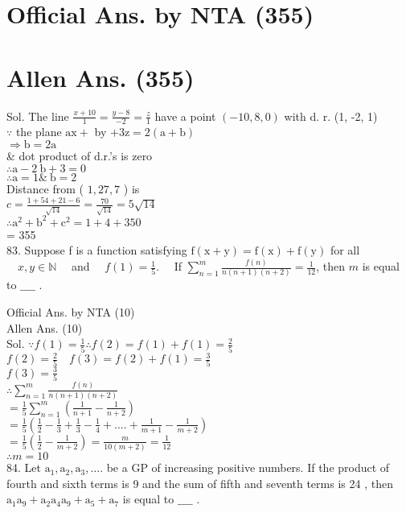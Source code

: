 \documentclass[10pt]{article}
\begin{document}
\section*{Official Ans. by NTA (355)}
\section*{Allen Ans. (355)}
Sol. The line \(\frac{x+10}{1}=\frac{y-8}{-2}=\frac{z}{1}\) have a point \((-10,8,0)\) with d. r. (1, -2, 1)\\
\(\because\) the plane \(\mathrm{ax}+\) by \(+3 \mathrm{z}=2(\mathrm{a}+\mathrm{b})\)\\
\(\Rightarrow \mathrm{b}=2 \mathrm{a}\)\\
\& dot product of d.r.'s is zero\\
\(\therefore \mathrm{a}-2 \mathrm{~b}+3=0\)\\
\(\therefore \mathrm{a}=1 \& \mathrm{~b}=2\)\\
Distance from ( \(1,27,7\) ) is\\
\(c=\frac{1+54+21-6}{\sqrt{14}}=\frac{70}{\sqrt{14}}=5 \sqrt{14}\)\\
\(\therefore \mathrm{a}^{2}+\mathrm{b}^{2}+\mathrm{c}^{2}=1+4+350\)\\
= 355\\
83. Suppose f is a function satisfying \(\mathrm{f}(\mathrm{x}+\mathrm{y})=\mathrm{f}(\mathrm{x})+\mathrm{f}(\mathrm{y})\) for all \(\quad x, y \in \mathbb{N} \quad\) and \(\quad f(1)=\frac{1}{5} . \quad\) If \(\sum_{n=1}^{m} \frac{f(n)}{n(n+1)(n+2)}=\frac{1}{12}\), then \(m\) is equal to \(\_\_\_\_\) .

Official Ans. by NTA (10)\\
Allen Ans. (10)\\
Sol. \(\because f(1)=\frac{1}{5} \therefore f(2)=f(1)+f(1)=\frac{2}{5}\)\\
\(f(2)=\frac{2}{5} \quad f(3)=f(2)+f(1)=\frac{3}{5}\)\\
\(f(3)=\frac{3}{5}\)\\
\(\therefore \sum_{n=1}^{m} \frac{f(n)}{n(n+1)(n+2)}\)\\
\(=\frac{1}{5} \sum_{n=1}^{m}\left(\frac{1}{n+1}-\frac{1}{n+2}\right)\)\\
\(=\frac{1}{5}\left(\frac{1}{2}-\frac{1}{3}+\frac{1}{3}-\frac{1}{4}+\ldots .+\frac{1}{m+1}-\frac{1}{m+2}\right)\)\\
\(=\frac{1}{5}\left(\frac{1}{2}-\frac{1}{m+2}\right)=\frac{m}{10(m+2)}=\frac{1}{12}\)\\
\(\therefore m=10\)\\
84. Let \(\mathrm{a}_{1}, \mathrm{a}_{2}, \mathrm{a}_{3}, \ldots\). be a GP of increasing positive numbers. If the product of fourth and sixth terms is 9 and the sum of fifth and seventh terms is 24 , then \(\mathrm{a}_{1} \mathrm{a}_{9}+\mathrm{a}_{2} \mathrm{a}_{4} \mathrm{a}_{9}+\mathrm{a}_{5}+\mathrm{a}_{7}\) is equal to \(\_\_\_\_\) .
\end{document}
